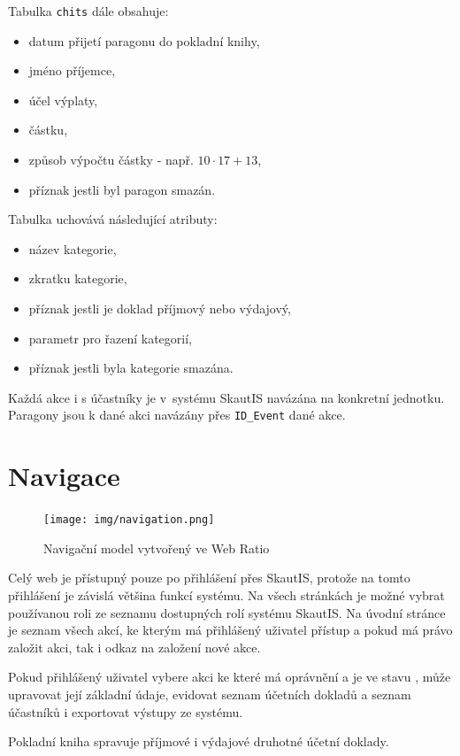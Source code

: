 \documentclass[thesis=B,czech]{FITthesis}[2011/06/14]
\begin{document}
Tabulka \texttt{chits} dále obsahuje:
 \begin{itemize}
 	\item datum přijetí paragonu do pokladní knihy,
 	\item jméno příjemce,
 	\item účel výplaty,
 	\item částku,
	\item způsob výpočtu částky - např. $10\cdot17+13$,
	\item příznak jestli byl paragon smazán.
\end{itemize} 

Tabulka  uchovává následující atributy:
 \begin{itemize}
 	\item název kategorie,
 	\item zkratku kategorie,
 	\item příznak jestli je doklad příjmový nebo výdajový,
 	\item parametr pro řazení kategorií,
 	\item příznak jestli byla kategorie smazána.
\end{itemize}

Každá akce i s účastníky je v~systému SkautIS navázána na konkretní jednotku. Paragony jsou k dané akci navázány přes \texttt{ID\_Event} dané akce. 

\section{Navigace}
 \begin{figure}[h] \centering
 	\texttt{[image: img/navigation.png]}
 	\caption[Navigační model]{Navigační model vytvořený ve Web Ratio}\label{fig:navigation-diagram}
 \end{figure}

Celý web je přístupný pouze po přihlášení přes SkautIS, protože na tomto přihlášení je závislá většina funkcí systému. Na všech stránkách je možné vybrat používanou roli ze seznamu dostupných rolí systému SkautIS. Na úvodní stránce je seznam všech akcí, ke kterým má přihlášený uživatel přístup a pokud má právo založit akci, tak i odkaz na založení nové akce.

Pokud přihlášený uživatel vybere akci ke které má oprávnění a je ve stavu , může upravovat její základní údaje, evidovat seznam účetních dokladů a seznam účastníků i exportovat výstupy ze systému.

Pokladní kniha spravuje příjmové i výdajové druhotné účetní doklady. 
\end{document}
